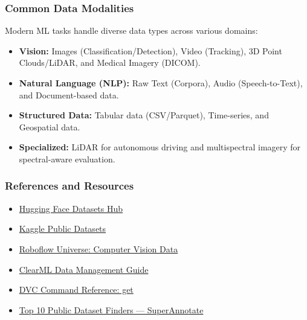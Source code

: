\documentclass[aspectratio=169]{beamer}
\begin{document}
\begin{frame}[t]
    \frametitle{Common Data Modalities}
    Modern ML tasks handle diverse data types across various domains:
    \begin{itemize}
        \item \textbf{Vision:} Images (Classification/Detection), Video (Tracking), 3D Point Clouds/LiDAR, and Medical Imagery (DICOM).
        \item \textbf{Natural Language (NLP):} Raw Text (Corpora), Audio (Speech-to-Text), and Document-based data.
        \item \textbf{Structured Data:} Tabular data (CSV/Parquet), Time-series, and Geospatial data.
        \item \textbf{Specialized:} LiDAR for autonomous driving and multispectral imagery for spectral-aware evaluation.
    \end{itemize}
\end{frame}
\begin{frame}[t]
    \frametitle{References and Resources}
    \begin{itemize}
        \item \href{https://huggingface.co/datasets}{Hugging Face Datasets Hub}
        \item \href{https://www.kaggle.com/datasets}{Kaggle Public Datasets}
        \item \href{https://universe.roboflow.com/}{Roboflow Universe: Computer Vision Data}
        \item \href{https://blog.deepschool.ru/data/clearml-data-management/}{ClearML Data Management Guide}
        \item \href{https://dvc.org/doc/command-reference/get}{DVC Command Reference: get}
        \item \href{https://superannotate.com/blog/top-10-public-dataset-finders}{Top 10 Public Dataset Finders — SuperAnnotate}
    \end{itemize}
\end{frame}
\end{document}

